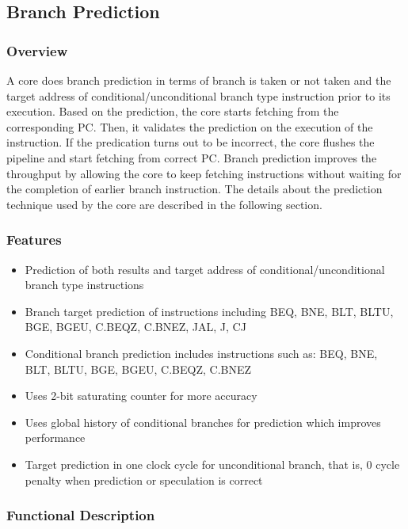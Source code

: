 \documentclass[main\_\_EN.tex]{subfiles}
\begin{document}

\subsection{Branch Prediction}
\label{sec:riscvcpu-perf-bp}

\subsubsection{Overview}
\label{sec:riscvcpu-perf-bp-overview}
A core does branch prediction in terms of branch is taken or not taken and the target address of conditional/unconditional branch type instruction prior to its execution. Based on the prediction, the core starts fetching from the corresponding PC. Then, it validates the prediction on the execution of the instruction. If the predication turns out to be incorrect, the core flushes the pipeline and start fetching from correct PC. Branch prediction improves the throughput by allowing the core to keep fetching instructions without waiting for the completion of earlier branch instruction. The details about the prediction technique used by the core are described in the following section.

\subsubsection{Features}
\label{sec:riscvcpu-perf-bp-features}
\begin{itemize}
    \item Prediction of both results and target address of conditional/unconditional branch type instructions
    \item Branch target prediction of instructions including BEQ, BNE, BLT, BLTU, BGE, BGEU, C.BEQZ, C.BNEZ, JAL, J, CJ
    \item Conditional branch prediction includes instructions such as: BEQ, BNE, BLT, BLTU, BGE, BGEU, C.BEQZ, C.BNEZ
    \item Uses 2-bit saturating counter for more accuracy
    \item Uses global history of conditional branches for prediction which improves performance
    \item Target prediction in one clock cycle for unconditional branch, that is, 0 cycle penalty when prediction or speculation is correct
\end{itemize}

\subsubsection{Functional Description}
\label{sec:riscvcpu-perf-bp-func-descr}
\end{document}
